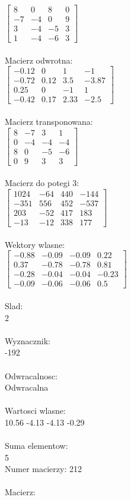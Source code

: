 \documentclass[a4paper,12pt]{article}
\begin{document}
$\begin{bmatrix} 8&0&8&0\\-7&-4&0&9\\3&-4&-5&3\\1&-4&-6&3 \end{bmatrix}$
\\
\\
Macierz odwrotna:\\

$\begin{bmatrix} -0.12&0&1&-1\\-0.72&0.12&3.5&-3.87\\0.25&0&-1&1\\-0.42&0.17&2.33&-2.5 \end{bmatrix}$
\\
\\
Macierz transponowana:\\

$\begin{bmatrix} 8&-7&3&1\\0&-4&-4&-4\\8&0&-5&-6\\0&9&3&3 \end{bmatrix}$
\\
\\
Macierz do potegi 3:\\

$\begin{bmatrix} 1024&-64&440&-144\\-351&556&452&-537\\203&-52&417&183\\-13&-12&338&177 \end{bmatrix}$
\\
\\
Wektory wlasne:\\

$\begin{bmatrix} -0.88&-0.09&-0.09&0.22\\0.37&-0.78&-0.78&0.81\\-0.28&-0.04&-0.04&-0.23\\-0.09&-0.06&-0.06&0.5 \end{bmatrix}$
\\
\\
Slad:\\
2
\\
\\
Wyznacznik:\\
-192
\\
\\
Odwracalnosc:\\
Odwracalna
\\
\\
Wartosci wlasne:\\
10.56 -4.13 -4.13 -0.29
\\
\\
Suma elementow:\\
5
\\
\newpage
Numer macierzy:
212
\\
\\
Macierz:\\
\end{document}
